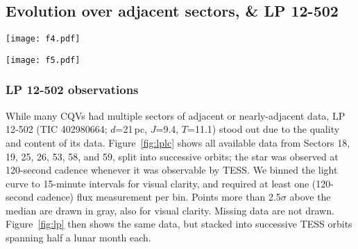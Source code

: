 \documentclass[11pt,twocolumn,tighten]{aastex63}
\begin{document}
\subsection{Evolution over adjacent sectors, \& LP 12-502}

\begin{figure*}[!tp]
	\begin{center}
		\centering
		\texttt{[image: f4.pdf]}
		\vspace{-0.4cm}
		\caption{
      {\bf LP 12-502 (TIC~402980664) light curve}, where each time
      chunk represents one TESS orbit.  Data were acquired in Sectors
      18-19, 25-26, 53, and 57-58.  Flares are drawn in gray.  The red
      vertical lines highlight apparently instantaneous state changes
      in the shape of the dip pattern.  The light curve is binned to
      15-minute intervals so that there are 96 points per day.  Data
      gaps with more than one missing 15-minute cadence appear in
      white.
		}
		\label{fig:lplc}
	\end{center}
\end{figure*}


\begin{figure*}[!t]
	\begin{center}
		\centering
		\texttt{[image: f5.pdf]}
		\vspace{-0.45cm}
		\caption{
      {\bf Evolution of LP 12-502} ($P$=18.6\,h) at fixed period and
      epoch over three years.  Each panel shows one (stacked) TESS
      orbit; small text denotes relative cycle number.  There are 200
      binned black points per cycle.  The TESS pointing law dictates
      time gaps; larger gaps tend to yield larger shape changes.  The
      dips usually evolve over tens to hundreds of cycles.  However
      cycles 1233-1264 show a dip that ``switched'' from a depth and
      duration of 3\% and 3\,hr to 0.3\% and 1\,hr over less than one
      cycle (cf.~Figure~\ref{fig:lplc}).
		}
		\label{fig:lp}
	\end{center}


\end{figure*}

\subsubsection{LP 12-502 observations}
While many CQVs had multiple sectors of adjacent or nearly-adjacent
data, LP 12-502 (TIC 402980664; $d$=21\,pc, $J$=9.4, $T$=11.1) stood
out due to the quality and content of its data.  Figure~\ref{fig:lplc}
shows all available data from Sectors 18, 19, 25, 26, 53, 58, and 59,
split into successive orbits; the star was observed at 120-second
cadence whenever it was observable by TESS.  We binned the light curve
to 15-minute intervals for visual clarity, and required at least one
(120-second cadence) flux measurement per bin.  Points more than
2.5$\sigma$ above the median are drawn in gray, also for visual
clarity.  Missing data are not drawn.  Figure~\ref{fig:lp} then shows
the same data, but stacked into successive TESS orbits spanning half a
lunar month each.
\end{document}
